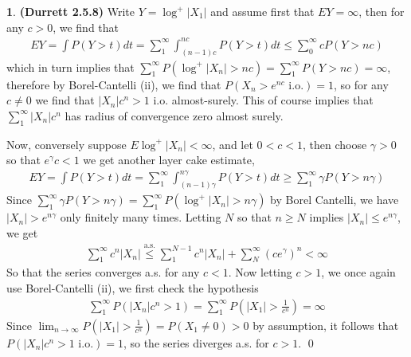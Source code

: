 \documentclass[10.5pt]{article}
\theoremstyle{definition}
\newtheorem{pb}{}
\newcommand{\abs}[1]{\lvert#1\rvert}
\begin{document}
    \begin{pb}\textbf{(Durrett 2.5.8)}
        Write \(Y = \log^+\abs{X_1}\) and assume first that \(EY = \infty\), then for any \(c > 0\), we find that
        \begin{align*}
            EY = \int P(Y>t)dt = \sum_1^\infty \int_{(n-1)c}^{nc} P(Y>t)dt \leq \sum_0^\infty cP(Y>nc)
        \end{align*}
        which in turn implies that \(\sum_1^\infty P(\log^+\abs{X_n} > nc) =  \sum_1^\infty P(Y > nc) = \infty\), therefore by Borel-Cantelli (ii), we find that \(P(X_n > e^{nc} \text{ i.o.}) = 1\), so for any \(c \neq 0\) we find that \(\abs{X_n}c^n > 1\) i.o. almost-surely. This of course implies that \(\sum_1^\infty \abs{X_n}c^n\) has radius of convergence zero almost surely.

        Now, conversely suppose \(E\log^+ \abs{X_n} < \infty\), and let \(0 < c < 1\), then choose \(\gamma > 0\) so that \(e^{\gamma}c < 1\) we get another layer cake estimate,
        \begin{align*}
            EY = \int P(Y>t)dt = \sum_1^\infty \int_{(n-1)\gamma}^{n\gamma} P(Y>t)dt \geq \sum_1^\infty \gamma P(Y>n\gamma)
        \end{align*}
        Since \(\sum_1^\infty \gamma P(Y>n\gamma) = \sum_1^\infty P(\log^+ \abs{X_n} > n\gamma)\) by Borel Cantelli, we have \(\abs{X_n} > e^{n\gamma}\) only finitely many times. Letting \(N\) so that \(n \geq N\) implies \(\abs{X_n} \leq e^{n\gamma}\), we get
        \begin{align*}
            \sum_1^\infty c^n\abs{X_n} \overset{\text{a.s.}}{\leq} \sum_1^{N-1}c^n\abs{X_n} + \sum_N^\infty (ce^{\gamma})^n < \infty
        \end{align*}
        So that the series converges a.s. for any \(c < 1\). Now letting \(c > 1\), we once again use Borel-Cantelli (ii), we first check the hypothesis
        \begin{align*}
            \sum_1^\infty P(\abs{X_n}c^n > 1) = \sum_1^\infty P(\abs{X_1} > \frac{1}{c^n}) = \infty
        \end{align*}
        Since \(\lim_{n\to\infty}P(\abs{X_1} > \frac{1}{c^n}) = P(X_1 \neq 0) > 0\) by assumption, it follows that \(P(\abs{X_n}c^n > 1 \text{ i.o.}) = 1\), so the series diverges a.s. for \(c > 1\). \qed
    \end{pb}
\end{document}
